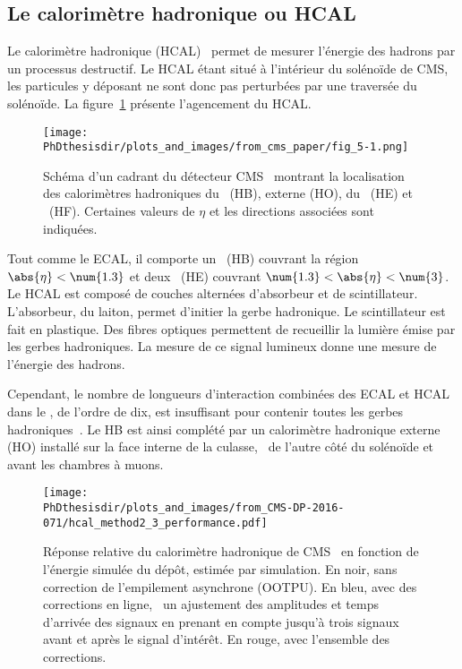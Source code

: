 \subsection{Le calorimètre hadronique ou HCAL}\label{chapter-LHC-section-CMS-subsec-HCAL}
Le calorimètre hadronique (HCAL)~\cite{cms_paper,CERN-LHCC-97-031,CMS-TDR-10} permet de mesurer l'énergie des hadrons par un processus destructif.
Le HCAL étant situé à l'intérieur du solénoïde de CMS, les particules y déposant ne sont donc pas perturbées par une traversée du solénoïde.
La figure~\ref{fig-chapter-LHC-section-CMS-subsec-HCAL-cms_paper-fig_5-1} présente l'agencement du HCAL.
\begin{figure}[b]
\centering
\texttt{[image: \\PhDthesisdir/plots\_and\_images/from\_cms\_paper/fig\_5-1.png]}
\caption[Schéma du calorimètre hadronique de CMS.]{Schéma d'un cadrant du détecteur CMS~\cite{cms_paper} montrant la localisation des calorimètres hadroniques du \CMSbarrel\ (HB), externe (HO), du \CMSendcap\ (HE) et \CMSforward\ (HF). Certaines valeurs de $\eta$ et les directions associées sont indiquées.}
\label{fig-chapter-LHC-section-CMS-subsec-HCAL-cms_paper-fig_5-1}
\end{figure}
\par Tout comme le ECAL, il comporte un \CMSbarrel\ (HB) couvrant la région $\abs{\eta}<\num{1.3}$ et deux \CMSendcaps\ (HE) couvrant $\num{1.3}<\abs{\eta}<\num{3}$.
Le HCAL est composé de couches alternées d'absorbeur et de scintillateur.
L'absorbeur, du laiton, permet d'initier la gerbe hadronique.
Le scintillateur est fait en plastique.
Des fibres optiques permettent de recueillir la lumière émise par les gerbes hadroniques.
La mesure de ce signal lumineux donne une mesure de l'énergie des hadrons.
\par Cependant, le nombre de longueurs d'interaction combinées des ECAL et HCAL dans le \CMSbarrel, de l'ordre de dix, est insuffisant pour contenir toutes les gerbes hadroniques~\cite{cms_paper}.
Le HB est ainsi complété par un calorimètre hadronique externe (HO) installé sur la face interne de la culasse, \ie\ de l'autre côté du solénoïde et avant les chambres à muons.
\begin{wrapfigure}{R}{.5\textwidth}
\centering
\texttt{[image: \\PhDthesisdir/plots\_and\_images/from\_CMS-DP-2016-071/hcal\_method2\_3\_performance.pdf]}
\caption[Réponse relative du calorimètre hadronique de CMS.]{Réponse relative du calorimètre hadronique de CMS~\cite{CMS-DP-2016-071} en fonction de l'énergie simulée du dépôt, estimée par simulation. En noir, sans correction de l'empilement asynchrone (OOTPU). En bleu, avec des corrections en ligne, \ie\ un ajustement des amplitudes et temps d'arrivée des signaux en prenant en compte jusqu'à trois signaux avant et après le signal d'intérêt. En rouge, avec l'ensemble des corrections.}
\label{fig-chapter-LHC-section-CMS-subsec-HCAL-CMS-DP-2016-071-hcal_method2_3_performance}
\end{wrapfigure}
